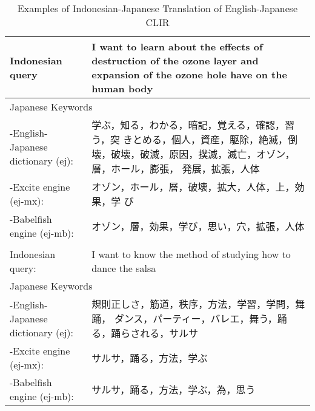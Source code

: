 \documentclass[english]{jnlp_1.3c}
\begin{document}
\begin{table}[t]
  \caption{Examples of Indonesian-Japanese Translation of
 English-Japanese CLIR}
  \label{table:11}
   \begin{center}
    \begin{tabular}{|l|l|}\hline
     \multicolumn{1}{|p{10em}|}{Indonesian query}
     &    \multicolumn{1}{|p{30em}|}{I want to learn about the
     effects of destruction of the ozone layer and expansion of the ozone
     hole have on the human body}   \\  \hline
      \multicolumn{2}{|l|}{Japanese Keywords} \\ \hline
      \multicolumn{1}{|p{10em}|}{-English-Japanese dictionary (ej):}
     &    \multicolumn{1}{|p{30em}|}{学ぶ，知る，わかる，暗記，覚える，確認，習う，突
     きとめる，個人，資産，駆除，絶滅，倒壊，破壊，破滅，原因，撲滅，滅亡，オゾン，層，ホール，膨張，
     発展，拡張，人体}   \\  \hline
     \multicolumn{1}{|p{10em}|}{-Excite engine (ej-mx):}
     &    \multicolumn{1}{|p{30em}|}{オゾン，ホール，層，破壊，拡大，人体，上，効果，学
     び}   \\  \hline
     \multicolumn{1}{|p{10em}|}{-Babelfish engine (ej-mb):}
     &    \multicolumn{1}{|p{30em}|}{オゾン，層，効果，学び，思い，穴，拡張，人体}   \\  \hline
     \multicolumn{2}{|l|}{} \\ \hline
     \multicolumn{1}{|p{10em}|}{Indonesian query:}
     &    \multicolumn{1}{|p{30em}|}{I want to know the method of
     studying how to dance the salsa}   \\  \hline
     \multicolumn{2}{|l|}{Japanese Keywords} \\ \hline
      \multicolumn{1}{|p{10em}|}{-English-Japanese dictionary (ej):}
     &    \multicolumn{1}{|p{30em}|}{規則正しさ，筋道，秩序，方法，学習，学問，舞踊，
     ダンス，パーティー，バレエ，舞う，踊る，踊らされる，サルサ}   \\  \hline
     \multicolumn{1}{|p{10em}|}{-Excite engine (ej-mx):}
     &    \multicolumn{1}{|p{30em}|}{サルサ，踊る，方法，学ぶ}   \\  \hline
     \multicolumn{1}{|p{10em}|}{-Babelfish engine (ej-mb):}
     &    \multicolumn{1}{|p{30em}|}{サルサ，踊る，方法，学ぶ，為，思う}   \\  \hline
    \end{tabular}
   \end{center}
\end{table}
\end{document}
